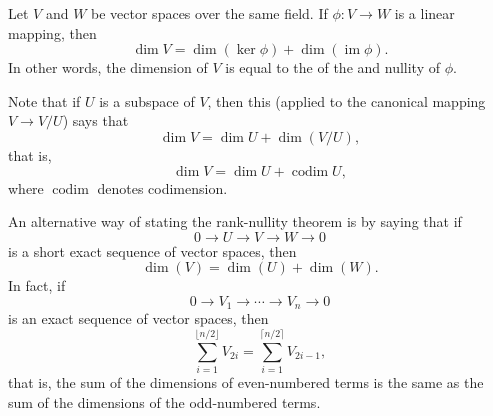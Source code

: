 \documentclass[12pt]{article}
\def\dim{\operatorname{dim}}
\def\codim{\operatorname{codim}}
\def\im{\operatorname{im}}
\def\ker{\operatorname{ker}}
\def\floor#1{\lfloor#1\rfloor}
\def\ceiling#1{\lceil#1\rceil}
\begin{document}

Let $V$ and $W$ be vector spaces over the same field.
If $\phi\colon V\to W$ is a linear mapping, then
\[
  \dim V = \dim(\ker\phi) + \dim(\im\phi).
\]
In other words, the dimension of $V$
is equal to the 
of the  and nullity of $\phi$.

Note that if $U$ is a subspace of $V$, then this
(applied to the canonical mapping $V\to V/U$) says that
\[
  \dim V = \dim U + \dim(V/U),
\]
that is,
\[
  \dim V = \dim U + \codim U,
\]
where $\codim$ denotes codimension.

An alternative way of stating the rank-nullity theorem is
by saying that if
\[
  0\to U\to V\to W\to 0
\]
is a short exact sequence of vector spaces, then
\[
  \dim(V) = \dim(U) + \dim(W).
\]
In fact, if
\[
  0\to V_1\to\cdots\to V_n\to 0
\]
is an exact sequence of vector spaces, then
\[
  \sum_{i=1}^{\floor{n/2}}V_{2i}=\sum_{i=1}^{\ceiling{n/2}}V_{2i-1},
\]
that is, the sum of the dimensions of even-numbered terms
is the same as the sum of the dimensions of the odd-numbered terms.

\end{document}
